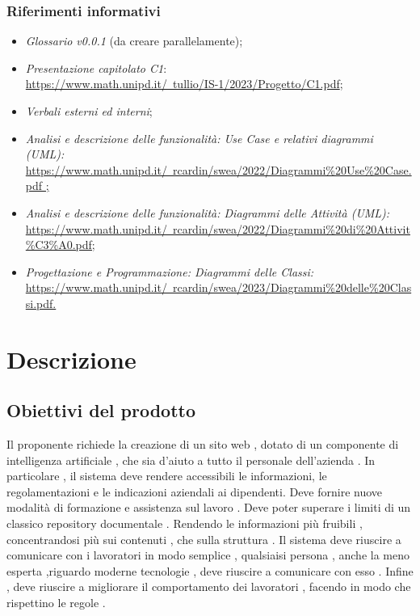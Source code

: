 \documentclass[10pt, a4paper]{article}
\begin{document}
    \subsubsection{Riferimenti informativi}
    
    \begin{itemize}
    \item \textit{Glossario v0.0.1} (da creare parallelamente); 
    \item \textit{Presentazione capitolato C1}:\\
    \href{https://www.math.unipd.it/~tullio/IS-1/2023/Progetto/C1.pdf}{https://www.math.unipd.it/~tullio/IS-1/2023/Progetto/C1.pdf};
    \item \textit{Verbali esterni ed interni};
    \item \textit{Analisi e descrizione delle funzionalità: Use Case e relativi diagrammi (UML):}\\
    \href{https://www.math.unipd.it/~rcardin/swea/2022/Diagrammi%20Use%20Case.pdf}{https://www.math.unipd.it/~rcardin/swea/2022/Diagrammi\%20Use\%20Case.pdf ;}
    \item \textit{Analisi e descrizione delle funzionalità: Diagrammi delle Attività (UML):}\\
    \href{https://www.math.unipd.it/~rcardin/swea/2022/Diagrammi%20di%20Attivit%C3%A0.pdf}{https://www.math.unipd.it/~rcardin/swea/2022/Diagrammi\%20di\%20Attivit\%C3\%A0.pdf;}
    

    \item \textit{Progettazione e Programmazione: Diagrammi delle Classi:}\\
    \href{https://www.math.unipd.it/~rcardin/swea/2023/Diagrammi%20delle%20Classi.pdf}{https://www.math.unipd.it/~rcardin/swea/2023/Diagrammi\%20delle\%20Classi.pdf.}
    \end{itemize}

\newpage
\section{Descrizione}
\subsection{Obiettivi del prodotto}
Il proponente richiede la creazione di un sito web , dotato di un componente di intelligenza artificiale , che sia d'aiuto a tutto il personale dell'azienda .
In particolare , il sistema deve rendere accessibili le informazioni, le regolamentazioni e le indicazioni aziendali ai dipendenti.
Deve fornire nuove modalità di formazione e assistenza sul lavoro .
Deve poter superare i limiti di un classico repository documentale . Rendendo le informazioni più fruibili , concentrandosi più sui contenuti , che sulla struttura .
Il sistema deve riuscire a comunicare con i lavoratori in modo semplice , qualsiaisi persona , anche la meno esperta ,riguardo moderne tecnologie , deve riuscire a comunicare con esso .
Infine , deve riuscire a migliorare il comportamento dei lavoratori , facendo in modo che rispettino le regole .
\end{document}
